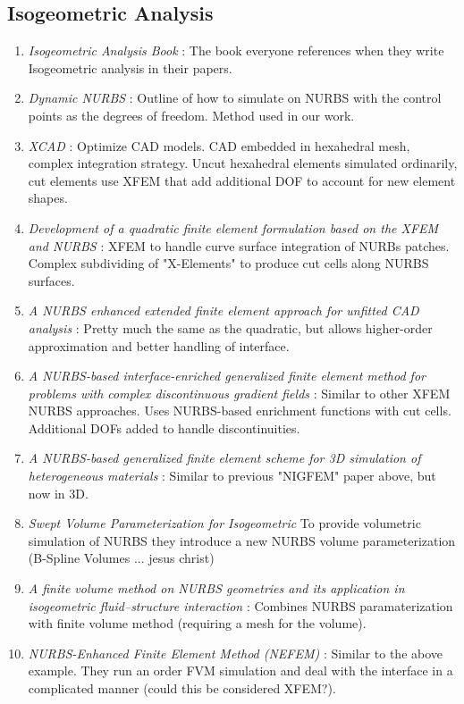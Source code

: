 \documentclass[sigconf]{acmart}
\begin{document}
\subsection{Isogeometric Analysis}
\begin{enumerate}
    \item \textit{Isogeometric Analysis Book} \cite{10.1002/9780470749081.ch7}: The book everyone references when they write Isogeometric analysis in their papers.
    \item \textit{Dynamic NURBS} \cite{10.1145/176579.176580}: Outline of how to simulate on NURBS with the control points as the degrees of freedom. Method used in our work.
    \item \textit{XCAD} \cite{10.1145/3355089.3356576}: Optimize CAD models. CAD embedded in hexahedral mesh, complex integration strategy. Uncut hexahedral elements simulated ordinarily, cut elements use XFEM that add additional DOF to account for new element shapes.
    \item \textit{Development of a quadratic finite element formulation based on the XFEM and NURBS} \cite{https://doi.org/10.1002/nme.3120}: XFEM to handle curve surface integration of NURBs patches. Complex subdividing of "X-Elements" to produce cut cells along NURBS surfaces.
    \item \textit{A NURBS enhanced extended finite element approach for unfitted CAD analysis} \cite{10.1007/s00466-013-0854-7}: Pretty much the same as the quadratic, but allows higher-order approximation and better handling of interface.
    \item \textit{A NURBS-based interface-enriched generalized finite element method for problems with complex discontinuous gradient fields} \cite{https://doi.org/10.1002/nme.4852}: Similar to other XFEM NURBS approaches. Uses NURBS-based enrichment functions with cut cells. Additional DOFs added to handle discontinuities.
    \item \textit{A NURBS-based generalized finite element scheme for 3D simulation of heterogeneous materials} \cite{SAFDARI2016373}: Similar to previous "NIGFEM" paper above, but now in 3D.
    \item \textit{Swept Volume Parameterization for Isogeometric} \cite{10.1007/978-3-642-03596-8_2} To provide volumetric simulation of NURBS they introduce a new NURBS volume parameterization (B-Spline Volumes ... jesus christ)
    \item \textit{A finite volume method on NURBS geometries and its application in isogeometric fluid–structure interaction} \cite{HEINRICH20121645}: Combines NURBS paramaterization with finite volume method (requiring a mesh for the volume). 
    \item \textit{NURBS-Enhanced Finite Element Method (NEFEM)} \cite{10.1002/nme.2311}: Similar to the above example. They run an order FVM simulation and deal with the interface in a complicated manner (could this be considered XFEM?).
\end{enumerate}
\end{document}
